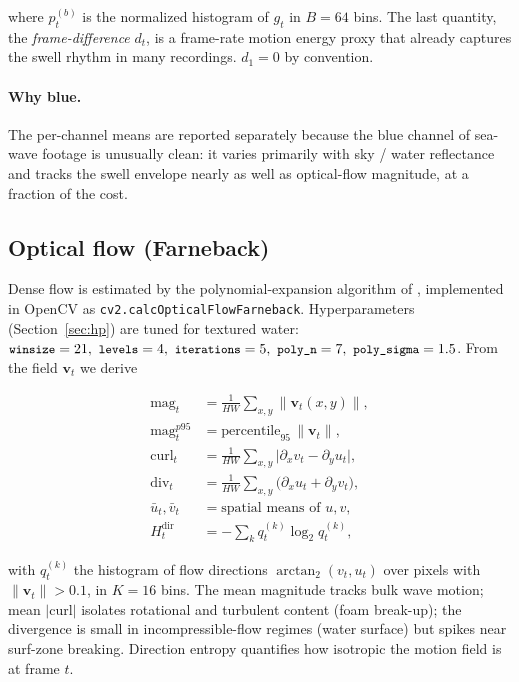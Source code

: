 \documentclass[11pt,a4paper]{article}
\newcommand{\code}[1]{\texttt{\small #1}}
\begin{document}
where $p_t^{(b)}$ is the normalized histogram of $g_t$ in $B=64$ bins. The
last quantity, the \emph{frame-difference} $d_t$, is a frame-rate motion
energy proxy that already captures the swell rhythm in many recordings.
$d_1 = 0$ by convention.

\paragraph{Why blue.} The per-channel means are reported separately because
the blue channel of sea-wave footage is unusually clean: it varies primarily
with sky / water reflectance and tracks the swell envelope nearly as well as
optical-flow magnitude, at a fraction of the cost.

\subsection{Optical flow (Farneback)}

Dense flow is estimated by the polynomial-expansion algorithm of
\citet{farneback2003}, implemented in OpenCV as
\code{cv2.calcOpticalFlowFarneback}. Hyperparameters (Section~\ref{sec:hp})
are tuned for textured water: $\code{winsize}=21,\
\code{levels}=4,\ \code{iterations}=5,\ \code{poly\_n}=7,\
\code{poly\_sigma}=1.5$. From the field $\mathbf{v}_t$ we derive

\begin{align}
  \mathrm{mag}_t      &= \tfrac{1}{HW}\textstyle\sum_{x,y} \|\mathbf{v}_t(x,y)\|, \\
  \mathrm{mag}_t^{p95}&= \mathrm{percentile}_{95}\, \|\mathbf{v}_t\|, \\
  \mathrm{curl}_t     &= \tfrac{1}{HW}\textstyle\sum_{x,y} \bigl|\partial_x v_t - \partial_y u_t\bigr|, \\
  \mathrm{div}_t      &= \tfrac{1}{HW}\textstyle\sum_{x,y} \bigl(\partial_x u_t + \partial_y v_t\bigr), \\
  \bar u_t, \bar v_t  &= \text{spatial means of } u, v, \\
  H^{\text{dir}}_t    &= -\textstyle\sum_k q_t^{(k)} \log_2 q_t^{(k)},
\end{align}

with $q_t^{(k)}$ the histogram of flow directions
$\arctan_2(v_t,u_t)$ over pixels with $\|\mathbf{v}_t\| > 0.1$, in $K=16$
bins. The mean magnitude tracks bulk wave motion; mean $|\mathrm{curl}|$
isolates rotational and turbulent content (foam break-up); the
divergence is small in incompressible-flow regimes (water surface) but
spikes near surf-zone breaking. Direction entropy quantifies how
isotropic the motion field is at frame $t$.
\end{document}

